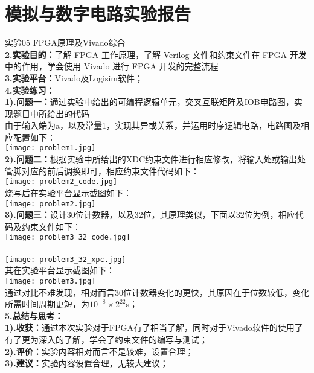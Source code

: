 \documentclass[12pt]{ctexart}
\begin{document}
\section*{模拟与数字电路实验报告}
实验05 FPGA原理及Vivado综合 \\
{\bf2.实验目的：}了解 FPGA 工作原理，了解 Verilog 文件和约束文件在 FPGA 开发中的作用，学会使用 Vivado 进行 FPGA 开发的完整流程\\
{\bf3.实验平台：}Vivado及Logisim软件；\\
{\bf4.实验练习：}\\
{\bf1).问题一：}通过实验中给出的可编程逻辑单元，交叉互联矩阵及IOB电路图，实现题目中所给出的代码\\
由于输入端为a，以及常量1，实现其异或关系，并运用时序逻辑电路，电路图及相应配置如下：\\
\texttt{[image: problem1.jpg]}\\
{\bf2).问题二：}根据实验中所给出的XDC约束文件进行相应修改，将输入处或输出处管脚对应的前后调换即可，相应约束文件代码如下：\\
\texttt{[image: problem2\_code.jpg]}\\
烧写后在实验平台显示截图如下：\\
\texttt{[image: problem2.jpg]}\\
{\bf3).问题三：}设计30位计数器，以及32位，其原理类似，下面以32位为例，相应代码及约束文件如下：\\
\texttt{[image: problem3\_32\_code.jpg]}\\\\
\texttt{[image: problem3\_32\_xpc.jpg]}\\
其在实验平台显示截图如下：\\
\texttt{[image: problem3.jpg]}\\
通过对比不难发现，相对而言30位计数器变化的更快，其原因在于位数较低，变化所需时间周期更短，为$10^{-8}\times  2^{22}$s；\\
{\bf5.总结与思考：}\\
{\bf1).收获：}通过本次实验对于FPGA有了相当了解，同时对于Vivado软件的使用了有了更为深入的了解，学会了约束文件的编写与测试；\\
{\bf2).评价：}实验内容相对而言不是较难，设置合理；\\
{\bf3).建议：}实验内容设置合理，无较大建议；
\end{document}
